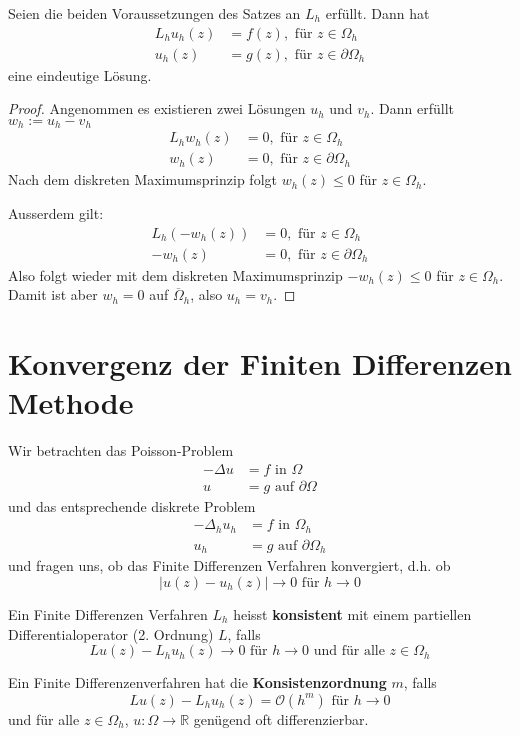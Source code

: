 \begin{kor}
Seien die beiden Voraussetzungen des Satzes an $L_h$ erfüllt. Dann hat
\begin{align*}
L_h u_h( z) &= f(z), \text{ für } z \in \Omega_h \\
u_h(z) &= g(z), \text{ für } z \in \partial \Omega_h
\end{align*}
eine eindeutige Lösung.
\end{kor}
\begin{proof}
Angenommen es existieren zwei Lösungen $u_h$ und $v_h$. Dann erfüllt $w_h := u_h - v_h$
\begin{align*}
L_h w_h(z) &= 0, \text{ für } z \in \Omega_h \\
w_h(z) &= 0, \text{ für } z \in \partial \Omega_h
\end{align*}
Nach dem diskreten Maximumsprinzip folgt $w_h(z) \leq 0$ für $z \in \Omega_h$.

Ausserdem gilt:
\begin{align*}
L_h (-w_h(z)) &= 0, \text{ für } z \in \Omega_h \\
-w_h(z) &= 0, \text{ für } z \in \partial \Omega_h
\end{align*}
Also folgt wieder mit dem diskreten Maximumsprinzip $-w_h(z) \leq 0$ für $z \in \Omega_h$.
Damit ist aber $w_h = 0$ auf $\overline \Omega_h$, also $u_h = v_h$.
\end{proof}

\section{Konvergenz der Finiten Differenzen Methode}
Wir betrachten das Poisson-Problem
\begin{align*}
- \Delta u &= f \text{ in } \Omega \\
u &= g \text{ auf } \partial \Omega
\end{align*}
und das entsprechende diskrete Problem
\begin{align*}
- \Delta_h u_h &= f \text{ in } \Omega_h \\
u_h &= g \text{ auf } \partial \Omega_h
\end{align*}
und fragen uns, ob das Finite Differenzen Verfahren konvergiert, d.h. ob
\[
|u(z) - u_h(z)| \to 0 \text{ für } h \to 0
\]

\begin{defi}
Ein Finite Differenzen Verfahren $L_h$ heisst \textbf{konsistent} mit einem partiellen
Differentialoperator (2. Ordnung) $L$, falls 
\[
Lu(z) - L_h u_h(z) \to 0 \text{ für } h \to 0 \text{ und für alle } z \in \Omega_h
\]

Ein Finite Differenzenverfahren hat die \textbf{Konsistenzordnung} $m$, falls 
\[
L u(z) - L_h u_h(z) = \mathcal O(h^m) \text{ für } h \to 0
\]
und für alle $z \in \Omega_h$, $u: \Omega \to \mathbb R$ genügend oft differenzierbar.
\end{defi}

